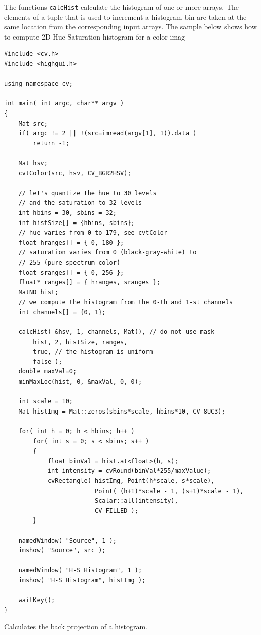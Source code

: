 The functions \texttt{calcHist} calculate the histogram of one or more
arrays. The elements of a tuple that is used to increment
a histogram bin are taken at the same location from the corresponding
input arrays. The sample below shows how to compute 2D Hue-Saturation histogram for a color imag

\begin{lstlisting}
#include <cv.h>
#include <highgui.h>

using namespace cv;

int main( int argc, char** argv )
{
    Mat src;
    if( argc != 2 || !(src=imread(argv[1], 1)).data )
        return -1;

    Mat hsv;
    cvtColor(src, hsv, CV_BGR2HSV);

    // let's quantize the hue to 30 levels
    // and the saturation to 32 levels
    int hbins = 30, sbins = 32;
    int histSize[] = {hbins, sbins};
    // hue varies from 0 to 179, see cvtColor
    float hranges[] = { 0, 180 };
    // saturation varies from 0 (black-gray-white) to
    // 255 (pure spectrum color)
    float sranges[] = { 0, 256 };
    float* ranges[] = { hranges, sranges };
    MatND hist;
    // we compute the histogram from the 0-th and 1-st channels
    int channels[] = {0, 1};
    
    calcHist( &hsv, 1, channels, Mat(), // do not use mask
        hist, 2, histSize, ranges,
        true, // the histogram is uniform
        false );
    double maxVal=0;
    minMaxLoc(hist, 0, &maxVal, 0, 0);
    
    int scale = 10;
    Mat histImg = Mat::zeros(sbins*scale, hbins*10, CV_8UC3);        

    for( int h = 0; h < hbins; h++ )
        for( int s = 0; s < sbins; s++ )
        {
            float binVal = hist.at<float>(h, s);
            int intensity = cvRound(binVal*255/maxValue);
            cvRectangle( histImg, Point(h*scale, s*scale),
                         Point( (h+1)*scale - 1, (s+1)*scale - 1),
                         Scalar::all(intensity),
                         CV_FILLED );
        }

    namedWindow( "Source", 1 );
    imshow( "Source", src );

    namedWindow( "H-S Histogram", 1 );
    imshow( "H-S Histogram", histImg );

    waitKey();
}
\end{lstlisting}


\label{calcBackProject}
Calculates the back projection of a histogram.

